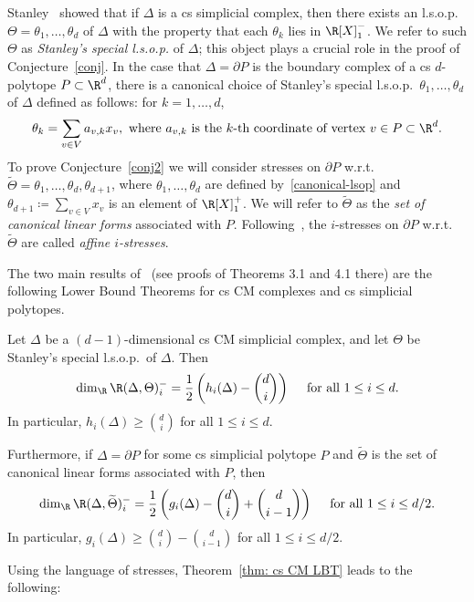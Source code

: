 Stanley~\cite{Stanley-87} showed that if $\Delta$ is a cs simplicial complex, then there exists an l.s.o.p.~$\Theta=\theta_1,\ldots,\theta_d$ of $\Delta$ with the property that each $\theta_k$ lies in $\R[X]^-_1$. We refer to such $\Theta$ as \emph{Stanley's special l.s.o.p.} of $\Delta$; this object plays a crucial role in the proof of Conjecture~\ref{conj}. In the case that $\Delta=\partial P$ is the boundary complex of a cs $d$-polytope $P\subset \R^d$, there is a canonical choice of Stanley's special l.s.o.p.~$\theta_1, \dots, \theta_d$ of $\Delta$ defined as follows: for $k=1,\ldots,d$,
\begin{equation} \label{canonical-lsop}
\theta_k=\sum_{v\in V} a_{v,k}x_v, \mbox{ where $a_{v,k}$ is the $k$-th coordinate of vertex $v\in P\subset \R^d$}.
\end{equation}
To prove Conjecture~\ref{conj2} we will consider stresses on $\partial P$ w.r.t.~$\widetilde{\Theta}=\theta_1,\ldots,\theta_d,\theta_{d+1}$, where $\theta_1,\ldots,\theta_d$ are defined by~\eqref{canonical-lsop} and $\theta_{d+1}\coloneqq \sum_{v\in V} x_v$ is an element of $\R[X]^+_1$. We will refer to $\widetilde{\Theta}$ as the \emph{set of canonical linear forms} associated with $P$. Following~\cite{Lee96}, the $i$-stresses on $\partial P$ w.r.t.~$\widetilde{\Theta}$ are called \emph{affine $i$-stresses}.

The two main results of~\cite{Stanley-87} (see proofs of Theorems 3.1 and 4.1 there) are the following Lower Bound Theorems for cs CM complexes and cs simplicial polytopes. 
\begin{theorem}\label{thm: cs CM LBT} 
Let $\Delta$ be a $(d-1)$-dimensional cs CM simplicial complex, and let $\Theta$ be Stanley's special l.s.o.p.~of $\Delta$. Then $$\dim_\R \R(\Delta, \Theta)^-_i=\frac{1}{2}\left(h_i(\Delta)-\binom{d}{i}\right) \quad \mbox{ for all $1\leq i\leq d$}.$$ In particular, $h_i(\Delta)\geq \binom{d}{i}$ for all $1\leq i\leq d$. 

Furthermore, if $\Delta=\partial P$ for some cs simplicial polytope $P$ and $\widetilde{\Theta}$ is the set of canonical linear forms associated with $P$, then $$\dim_\R \R(\Delta, \widetilde{\Theta})^-_i=\frac{1}{2}\left(g_i(\Delta)-\binom{d}{i}+\binom{d}{i-1}\right) \quad \mbox{ for all $1\leq i\leq d/2$}.$$ In particular, $g_i(\Delta)\geq \binom{d}{i}-\binom{d}{i-1}$ for all $1\leq i\leq d/2$. 
\end{theorem}

Using the language of stresses, Theorem~\ref{thm: cs CM LBT} leads to the following:

